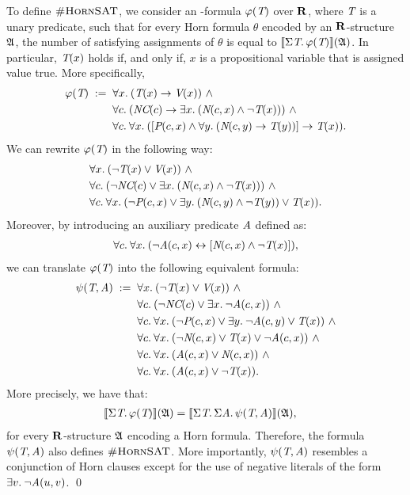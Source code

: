 \begin{exa}
To define $\textsc{\#HornSAT}$, we consider an \so-formula $\varphi(\textit{T})$ over $\mathbf{R}$, where $\textit{T}$ is a unary predicate, such that for every Horn formula $\theta$ encoded by an $\mathbf{R}$-structure $\mathfrak{A}$, the number of satisfying assignments of $\theta$ is equal to ${\llbracket{}{\Sigma{\textit{T}}.\, \varphi(\textit{T})}\rrbracket}(\mathfrak{A})$. In particular, $\textit{T}(x)$ holds if, and only if, $x$ is a propositional variable that is assigned value true.  More specifically, 
\begin{align*}
\varphi(\pT) \; :=\;\;  & \fa{x} (\pT(x) \to \pV(x)) \ \wedge\\
& \fa{c}  (\pNC(c) \to \ex{x} (\pN(c,x) \wedge \neg \pT(x))) \ \wedge\\
& \fa{c} \fa{x} ([\pP(c,x) \wedge \fa{y} (\pN(c,y) \to \pT(y))] \to \pT(x)).
\end{align*}
We can rewrite $\varphi(\textit{T})$ in the following way:
\begin{align*}
& \fa{x}  (\neg \pT(x) \vee \pV(x)) \ \wedge\\
& \fa{c}  (\neg \pNC(c) \vee \ex{x} (\pN(c,x) \wedge \neg \pT(x)))\ \wedge\\
& \fa{c} \fa{x}  (\neg \pP(c,x) \vee \ex{y} (\pN(c,y) \wedge \neg \pT(y)) \vee \pT(x)).
\end{align*}
Moreover, by introducing an auxiliary predicate $\textit{A}$ defined as:
\begin{align*}
\forall{c}.\: \forall{x}.\:  (\neg \textit{A}(c,x) \leftrightarrow [\textit{N}(c,x) \wedge \neg \textit{T}(x)]),
\end{align*}
we can translate $\varphi(\textit{T})$ into the following equivalent formula:
\begin{align*}
\psi(\pT,\pA) \; := \;\;  & \fa{x} (\neg \pT(x) \vee \pV(x)) \ \wedge\\
& \fa{c} (\neg \textit{NC}(c) \vee \ex{x} \neg \textit{A}(c,x)) \ \wedge\\
& \fa{c} \fa{x}  (\neg \textit{P}(c,x) \vee \ex{y} \neg \textit{A}(c,y) \vee \textit{T}(x)) \ \wedge\\
& \fa{c} \fa{x} (\neg \textit{N}(c,x) \vee \textit{T}(x) \vee \neg \textit{A}(c,x)) \ \wedge \\
& \fa{c} \fa{x} (\textit{A}(c,x) \vee \textit{N}(c,x)) \ \wedge\\
& \fa{c} \fa{x} (\textit{A}(c,x) \vee \neg\textit{T}(x)).
\end{align*}
More precisely, we have that:
\begin{align*}
{\llbracket{}{\Sigma{\textit{T}}.\, \varphi(\textit{T})}\rrbracket}(\mathfrak{A}) &= {\llbracket{}{\Sigma{\textit{T}}.\, \Sigma{\textit{A}}.\, \psi(\textit{T},\textit{A})}\rrbracket}(\mathfrak{A}),
\end{align*}
 for every $\mathbf{R}$-structure $\mathfrak{A}$ encoding a Horn formula. Therefore, the formula $\psi(\textit{T},\textit{A})$ also defines $\textsc{\#HornSAT}$. More importantly, $\psi(\textit{T},\textit{A})$ resembles a conjunction of Horn clauses except for the use of negative literals of the form $\exists{v}.\: \neg \textit{A}(u,v)$. \qed
\end{exa}
